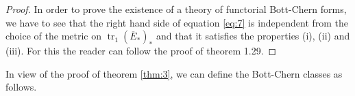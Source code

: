 \documentclass[10pt,twoside]{article}
\numberwithin{equation}{section}
\theoremstyle{plain}
\theoremstyle{definition}
\DeclareMathOperator{\tr}{tr}
\DeclareMathOperator{\dd}{d}
\begin{document}
\begin{proof}
In order to prove the existence of a theory of functorial Bott-Chern
forms, we have to see that the right hand 
side of equation
\eqref{eq:7} is independent from the choice of the metric on
$\tr_{1}(\overline{E}_{\ast})_{\ast}$  and that it satisfies
the properties (i), (ii) and
(iii). For this the reader can follow the proof of
\cite{BismutGilletSoule:at} theorem 
1.29. 



\end{proof}

In view of the proof of theorem \ref{thm:3}, we can define the
Bott-Chern classes as follows.
\end{document}
